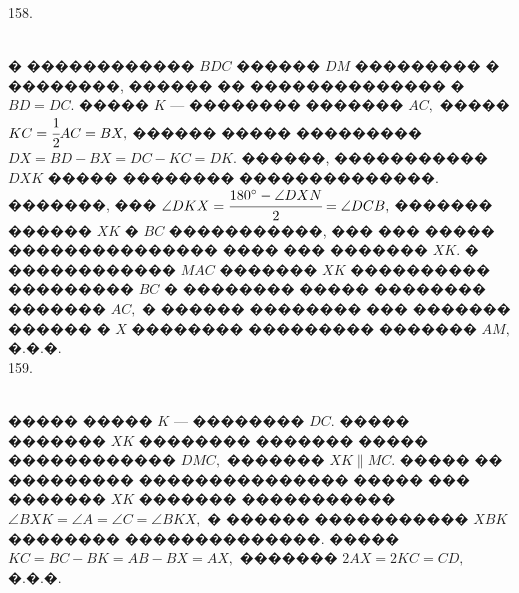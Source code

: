 \documentclass[12pt]{article}
\begin{document}
158. \begin{figure}[ht!]
\end{figure}\\
� ������������ $BDC$ ������ $DM$ ��������� � ��������, ������ �� �������������� � $BD=DC.$ ����� $K$ --- �������� ������� $AC,$ ����� $KC=\cfrac{1}{2} AC=BX,$ ������ ����� ��������� $DX=BD-BX=DC-KC=DK.$ ������, ����������� $DXK$ ����� �������� ��������������. �������, ��� $\angle DKX=\cfrac{180^\circ-\angle DXN}{2}=\angle DCB,$ ������� ������ $XK$ � $BC$ �����������, ��� ��� ����� ��������������� ���� ��� ������� $XK.$ � ������������ $MAC$ ������� $XK$ ���������� ��������� $BC$ � �������� ����� �������� ������� $AC,$ � ������ �������� ��� ������� ������ � $X$ �������� ��������� ������� $AM,$ �.�.�.\\
159. \begin{figure}[ht!]
\end{figure}\\
����� ����� $K$ --- �������� $DC.$ ����� ������� $XK$ �������� ������� ����� ������������ $DMC,$ ������� $XK\parallel MC.$ ����� �� ��������� ��������������� ����� ��� ������� $XK$ ������� ����������� $\angle BXK=\angle A=\angle C=\angle BKX,$ � ������ ����������� $XBK$ �������� ��������������. ����� $KC=BC-BK=AB-BX=AX,$ ������� $2AX=2KC=CD,$ �.�.�.
\end{document}
